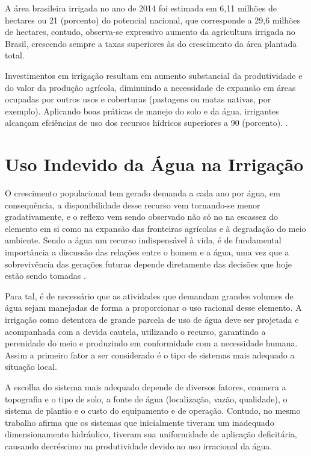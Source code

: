 A área brasileira irrigada no ano de 2014 foi estimada em 6,11 milhões de hectares  ou 21 (porcento) do potencial nacional, que corresponde a 29,6 milhões de hectares, contudo, observa-se expressivo aumento da agricultura irrigada no Brasil, crescendo sempre a taxas superiores às do crescimento da área plantada total.

Investimentos em irrigação resultam em aumento substancial da produtividade e do valor da produção agrícola, diminuindo a necessidade de expansão em áreas ocupadas por outros usos e coberturas (pastagens ou matas nativas, por exemplo). Aplicando boas práticas de manejo do solo e da água, irrigantes alcançam efciências de uso dos recursos hídricos superiores a 90 (porcento). \cite{ana2015}.

\section{Uso Indevido da Água na Irrigação}

O crescimento populacional tem gerado demanda a cada ano por água, em consequência, a disponibilidade desse recurso vem tornando-se menor gradativamente, e o reflexo vem sendo observado não só no na escassez do elemento em si como na expansão das fronteiras agrícolas e à degradação do meio ambiente. Sendo a água um recurso indispensável à vida, é de fundamental importância a discussão das relações entre o homem e a água, uma vez que a sobrevivência das gerações futuras depende diretamente das decisões que hoje estão sendo tomadas \cite{lima1999uso}.

Para tal, é de necessário que as atividades que demandam grandes volumes de água sejam manejadas de forma a proporcionar o uso racional desse elemento. A irrigação como detentora de grande parcela de uso de água deve ser projetada e acompanhada com a devida cautela, utilizando o recurso, garantindo a perenidade do meio e produzindo em conformidade com a necessidade humana. Assim a primeiro fator a ser considerado é o tipo de sistemas mais adequado a situação local.

A escolha do sistema mais adequado depende de diversos fatores, \cite{de2006avaliaccao} enumera a topografia e o tipo de solo, a fonte de água (localização, vazão, qualidade), o sistema de plantio e o custo do equipamento e de operação. Contudo, no mesmo trabalho afirma que os sistemas que inicialmente tiveram um inadequado dimensionamento hidráulico, tiveram sua uniformidade de aplicação deficitária, causando decréscimo na produtividade devido ao uso irracional da água.



